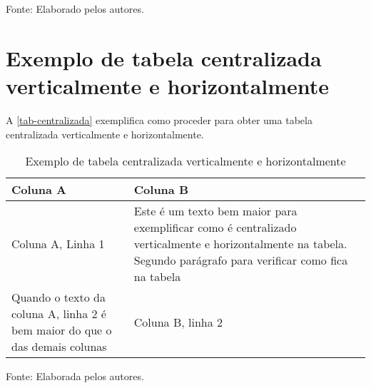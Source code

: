 \begin{apendicesenv}
\begin{quadro}[htb]
\begin{tabular}{|p{6.5cm}|p{6.5cm}|p{1.75cm}|}
	\end{tabular}
	\begin{flushleft}
		Fonte: Elaborado pelos autores.\
	\end{flushleft}
\end{quadro}

\chapter{Exemplo de tabela centralizada verticalmente e horizontalmente}
\index{tabelas}A \autoref{tab-centralizada} exemplifica como proceder para obter uma tabela centralizada verticalmente e horizontalmente.
\begin{table}[htb]
\ABNTEXfontereduzida
\caption[Exemplo de tabela centralizada verticalmente e horizontalmente]{Exemplo de tabela centralizada verticalmente e horizontalmente}
\label{tab-centralizada}

\begin{tabular}{ >{\centering\arraybackslash}m{6cm}  >{\centering\arraybackslash}m{6cm} }
\hline
 \centering \textbf{Coluna A} & \textbf{Coluna B}\\
\hline
  Coluna A, Linha 1 & Este é um texto bem maior para exemplificar como é centralizado verticalmente e horizontalmente na tabela. Segundo parágrafo para verificar como fica na tabela\\
  Quando o texto da coluna A, linha 2 é bem maior do que o das demais colunas  & Coluna B, linha 2\\
\hline
\end{tabular}
\begin{flushleft}
		Fonte: Elaborada pelos autores.\
\end{flushleft}
\end{table}


\end{apendicesenv}
